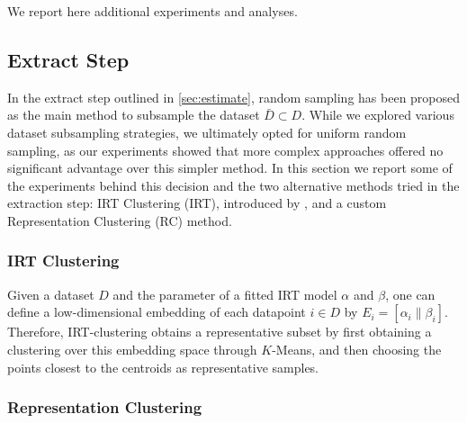 \label{app:add-exp}
We report here additional experiments and analyses.

\subsection{Extract Step} \label{app:add-exp:extract-ste} 
In the extract step outlined in \cref{sec:estimate}, random sampling has been proposed as the main method to subsample the dataset $\bar{D} \subset D$. 
While we explored various dataset subsampling strategies, we ultimately opted for uniform random sampling, as our experiments showed that more complex approaches offered no significant advantage over this simpler method. In this section we report some of the experiments behind this decision and the two alternative methods tried in the extraction step: IRT Clustering (IRT), introduced by \citet{tinybenchmarks}, and a custom Representation Clustering (RC) method.

\subsubsection{IRT Clustering} Given a dataset $D$ and the parameter of a fitted IRT model $\alpha$ and $\beta$, one can define a low-dimensional embedding of each datapoint $i \in D$ by $E_i = [\alpha_i \| \beta_i]$. Therefore, IRT-clustering obtains a representative subset by first obtaining a clustering over this embedding space through $K$-Means, and then choosing the points closest to the centroids as representative samples.

\subsubsection{Representation Clustering} 


